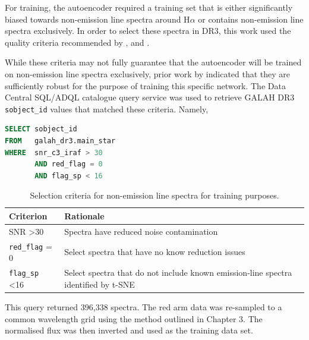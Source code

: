 For training, the autoencoder required a training set that is either significantly biased towards non-emission line spectra around H$\alpha$ or contains non-emission line spectra exclusively. In order to select these spectra in DR3, this work used the quality criteria recommended by \citet{vcotar2021galah}, \citet{buder2021galah+} and \citet{kos2017galah}. 

While these criteria may not fully guarantee that the autoencoder will be trained on non-emission line spectra exclusively, prior work by \citet{vcotar2021galah} indicated that they are sufficiently robust for the purpose of training this specific network. The Data Central SQL/ADQL catalogue query service was used to retrieve GALAH DR3 \texttt{sobject\_id} values that matched these criteria. Namely,

\begin{lstlisting}[language=SQL]
SELECT sobject_id
FROM   galah_dr3.main_star
WHERE  snr_c3_iraf > 30
       AND red_flag = 0
       AND flag_sp < 16 
\end{lstlisting}

\begin{table}[!htb]
\begin{center}
\begin{tabular}{|l|l|}
\hline
\textbf{Criterion}    & \textbf{Rationale}                                                                 \\ \hline
SNR \textgreater 30   & Spectra have reduced noise contamination      \\ \hline
\texttt{red\_flag} = 0         & Select spectra that have no know reduction issues                                  \\ \hline
\texttt{flag\_sp} \textless 16 & Select spectra that do not include known emission-line spectra identified by t-SNE \\ \hline
\end{tabular}
\caption{Selection criteria for non-emission line spectra for training purposes.}
\label{table:Selection Criteria}
\end{center}
\end{table}
This query returned 396,338 spectra. The red arm data was re-sampled to a common wavelength grid using the method outlined in Chapter 3. The normalised flux was then inverted and used as the training data set.

